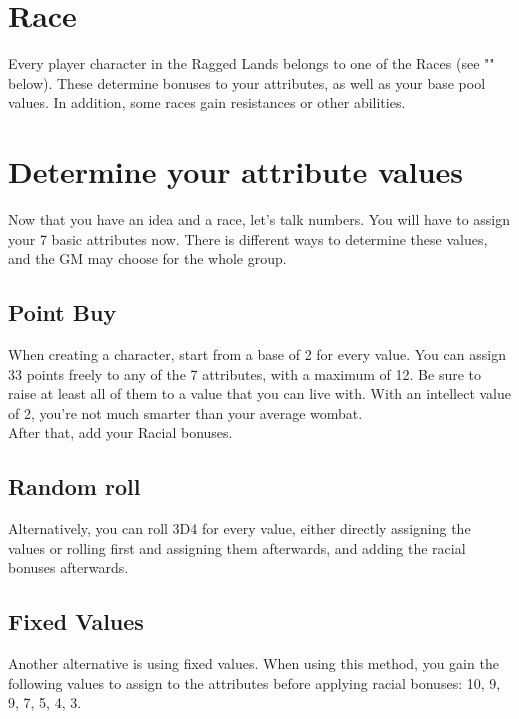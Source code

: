 \section{Race}\label{sec:charCreationRace}

Every player character in the Ragged Lands belongs to one of the Races (see "" below).
These determine bonuses to your attributes, as well as your base pool values. 
In addition, some races gain resistances or other abilities.


\section{Determine your attribute values}\label{sec:determineAttributes}

Now that you have an idea and a race, let's talk numbers.
You will have to assign your 7 basic attributes now.
There is different ways to determine these values, and the GM may choose for the whole group.


\subsection{Point Buy}\label{subsec:pointBuy}

When creating a character, start from a base of 2 for every value.
You can assign 33 points freely to any of the 7 attributes, with a maximum of 12.
Be sure to raise at least all of them to a value that you can live with.
With an intellect value of 2, you're not much smarter than your average wombat.\\
After that, add your Racial bonuses.



\subsection{Random roll}\label{subsec:pointRoll}

Alternatively, you can roll 3D4 for every value, either directly assigning the values or rolling first and assigning them afterwards, and adding the racial bonuses afterwards. 


\subsection{Fixed Values}\label{subsec:pointFixed}

Another alternative is using fixed values.
When using this method, you gain the following values to assign to the attributes before applying racial bonuses: 10, 9, 9, 7, 5, 4, 3.



